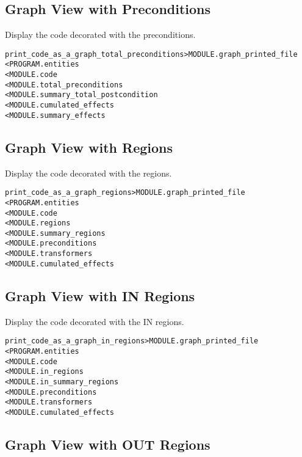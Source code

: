 \documentclass[a4paper]{report}
\newenvironment{PipsMake}{\begin{alltt}}{\end{alltt}}
\begin{document}
\subsection{Graph View with Preconditions}

Display the code decorated with the preconditions.

\begin{PipsMake}
print_code_as_a_graph_total_preconditions        > MODULE.graph_printed_file
        < PROGRAM.entities
        < MODULE.code
        < MODULE.total_preconditions
        < MODULE.summary_total_postcondition
        < MODULE.cumulated_effects
        < MODULE.summary_effects
\end{PipsMake}

\subsection{Graph View with Regions}

Display the code decorated with the regions.

\begin{PipsMake}
print_code_as_a_graph_regions              > MODULE.graph_printed_file
        < PROGRAM.entities
        < MODULE.code
        < MODULE.regions
        < MODULE.summary_regions
        < MODULE.preconditions
        < MODULE.transformers
        < MODULE.cumulated_effects
\end{PipsMake}

\subsection{Graph View with IN Regions}

Display the code decorated with the IN regions.

\begin{PipsMake}
print_code_as_a_graph_in_regions              > MODULE.graph_printed_file
        < PROGRAM.entities
        < MODULE.code
        < MODULE.in_regions
        < MODULE.in_summary_regions
        < MODULE.preconditions
        < MODULE.transformers
        < MODULE.cumulated_effects
\end{PipsMake}

\subsection{Graph View with OUT Regions}
\end{document}
